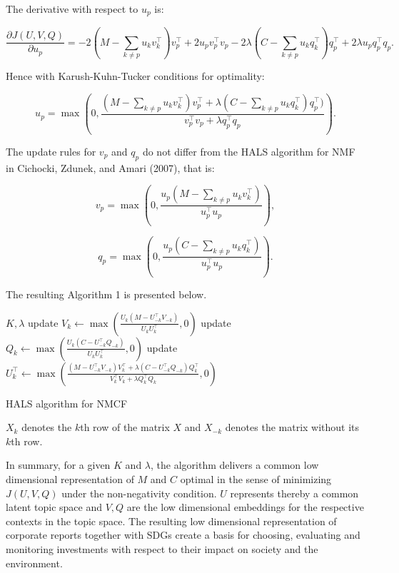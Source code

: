 \documentclass[
]{article}
\begin{document}
The derivative with respect to \(u_p\) is:

\[\frac{\partial J(U,V,Q)}{\partial u_p} = - 2(M-\sum_{k\not=p} u_kv_k^\top)v_p^\top + 2u_pv_p^\top v_p - 2\lambda (C-\sum_{k\not=p} u_kq_k^\top)q_p^\top + 2\lambda u_pq_p^\top q_p.\]

Hence with Karush-Kuhn-Tucker conditions for optimality:

\[u_p = \max\left(0, \frac{(M-\sum_{k\not=p} u_kv_k^\top)v_p^\top + \lambda (C-\sum_{k\not=p} u_kq_k^\top)q_p^\top)}{v_p^\top v_p + \lambda q_p^\top q_p}\right).\]

The update rules for \(v_p\) and \(q_p\) do not differ from the HALS algorithm for NMF in Cichocki, Zdunek, and Amari (2007), that is:

\[v_p = \max\left(0, \frac{u_p(M-\sum_{k\not=p} u_kv_k^\top)}{u_p^\top u_p}\right),\]

\[q_p = \max\left(0, \frac{u_p(C-\sum_{k\not=p} u_kq_k^\top)}{u_p^\top u_p}\right).\]

The resulting Algorithm 1 is presented below.

\begin{algorithm}[H]
\begin{algorithmic}
\REQUIRE $K, \lambda$
\STATE update $V_k\leftarrow \max\left(\frac{U_k(M-U_{-k}^\top V_{-k})}{U_kU_k^\top },0\right)$
\STATE update $Q_k\leftarrow \max\left(\frac{U_k(C-U_{-k}^\top Q_{-k})}{U_kU_k^\top},0\right)$
\STATE update $U_k^\top \leftarrow \max\left(\frac{(M-U_{-k}^\top V_{-k})V_k^\top + \lambda (C-U_{-k}^\top Q_{-k})Q_k^\top}{ V_k^\top V_k  + \lambda Q_k^\top Q_k },0\right)$
\ENDFOR
\ENDWHILE
\end{algorithmic}
\caption{HALS algorithm for NMCF}
\end{algorithm}

\(X_k\) denotes the \(k\)th row of the matrix \(X\) and \(X_{-k}\) denotes the matrix without its \(k\)th row.

In summary, for a given \(K\) and \(\lambda\), the algorithm delivers a common low dimensional representation of \(M\) and \(C\) optimal in the sense of minimizing \(J(U,V,Q)\) under the non-negativity condition. \(U\) represents thereby a common latent topic space and \(V,Q\) are the low dimensional embeddings for the respective contexts in the topic space. The resulting low dimensional representation of corporate reports together with SDGs create a basis for choosing, evaluating and monitoring investments with respect to their impact on society and the environment.
\end{document}
